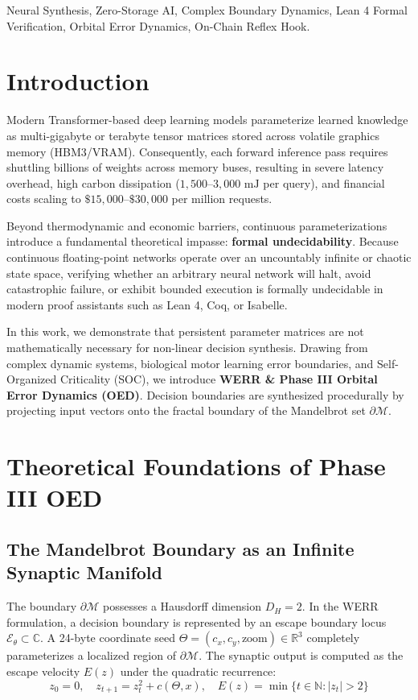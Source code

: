 \documentclass[journal,onecolumn]{IEEEtran}
\begin{document}
\begin{IEEEkeywords}
Neural Synthesis, Zero-Storage AI, Complex Boundary Dynamics, Lean 4 Formal Verification, Orbital Error Dynamics, On-Chain Reflex Hook.
\end{IEEEkeywords}

\section{Introduction}
Modern Transformer-based deep learning models parameterize learned knowledge as multi-gigabyte or terabyte tensor matrices stored across volatile graphics memory (HBM3/VRAM). Consequently, each forward inference pass requires shuttling billions of weights across memory buses, resulting in severe latency overhead, high carbon dissipation ($1,500\text{--}3,000\text{ mJ}$ per query), and financial costs scaling to $\$15,000\text{--}\$30,000$ per million requests.

Beyond thermodynamic and economic barriers, continuous parameterizations introduce a fundamental theoretical impasse: \textbf{formal undecidability}. Because continuous floating-point networks operate over an uncountably infinite or chaotic state space, verifying whether an arbitrary neural network will halt, avoid catastrophic failure, or exhibit bounded execution is formally undecidable in modern proof assistants such as Lean 4, Coq, or Isabelle.

In this work, we demonstrate that persistent parameter matrices are not mathematically necessary for non-linear decision synthesis. Drawing from complex dynamic systems, biological motor learning error boundaries, and Self-Organized Criticality (SOC), we introduce \textbf{WERR \& Phase III Orbital Error Dynamics (OED)}. Decision boundaries are synthesized procedurally by projecting input vectors onto the fractal boundary of the Mandelbrot set $\partial \mathcal{M}$.

\section{Theoretical Foundations of Phase III OED}
\subsection{The Mandelbrot Boundary as an Infinite Synaptic Manifold}
The boundary $\partial \mathcal{M}$ possesses a Hausdorff dimension $D_H = 2$. In the WERR formulation, a decision boundary is represented by an escape boundary locus $\mathcal{E}_\theta \subset \mathbb{C}$. A 24-byte coordinate seed $\Theta = (c_x, c_y, \text{zoom}) \in \mathbb{R}^3$ completely parameterizes a localized region of $\partial \mathcal{M}$. The synaptic output is computed as the escape velocity $E(z)$ under the quadratic recurrence:
\begin{equation}
z_0 = 0, \quad z_{t+1} = z_t^2 + c(\Theta, x), \quad E(z) = \min \{ t \in \mathbb{N} : |z_t| > 2 \}
\end{equation}
\end{document}
